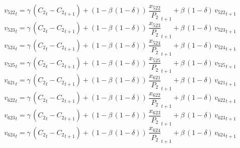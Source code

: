 \begin{dmath}
{{v_{522}}}_{t}={{\gamma}}\, \left({{C_{2}}}_{t}-{{C_{2}}}_{t+1}\right)+\left(1-{{\beta}}\, \left(1-{{\delta}}\right)\right)\, {{\frac{x_{522}}{P_{2}}}}_{t+1}+{{\beta}}\, \left(1-{{\delta}}\right)\, {{v_{522}}}_{t+1}
\end{dmath}
\begin{dmath}
{{v_{523}}}_{t}={{\gamma}}\, \left({{C_{2}}}_{t}-{{C_{2}}}_{t+1}\right)+\left(1-{{\beta}}\, \left(1-{{\delta}}\right)\right)\, {{\frac{x_{523}}{P_{2}}}}_{t+1}+{{\beta}}\, \left(1-{{\delta}}\right)\, {{v_{523}}}_{t+1}
\end{dmath}
\begin{dmath}
{{v_{524}}}_{t}={{\gamma}}\, \left({{C_{2}}}_{t}-{{C_{2}}}_{t+1}\right)+\left(1-{{\beta}}\, \left(1-{{\delta}}\right)\right)\, {{\frac{x_{524}}{P_{2}}}}_{t+1}+{{\beta}}\, \left(1-{{\delta}}\right)\, {{v_{524}}}_{t+1}
\end{dmath}
\begin{dmath}
{{v_{525}}}_{t}={{\gamma}}\, \left({{C_{2}}}_{t}-{{C_{2}}}_{t+1}\right)+\left(1-{{\beta}}\, \left(1-{{\delta}}\right)\right)\, {{\frac{x_{525}}{P_{2}}}}_{t+1}+{{\beta}}\, \left(1-{{\delta}}\right)\, {{v_{525}}}_{t+1}
\end{dmath}
\begin{dmath}
{{v_{621}}}_{t}={{\gamma}}\, \left({{C_{2}}}_{t}-{{C_{2}}}_{t+1}\right)+\left(1-{{\beta}}\, \left(1-{{\delta}}\right)\right)\, {{\frac{x_{621}}{P_{2}}}}_{t+1}+{{\beta}}\, \left(1-{{\delta}}\right)\, {{v_{621}}}_{t+1}
\end{dmath}
\begin{dmath}
{{v_{622}}}_{t}={{\gamma}}\, \left({{C_{2}}}_{t}-{{C_{2}}}_{t+1}\right)+\left(1-{{\beta}}\, \left(1-{{\delta}}\right)\right)\, {{\frac{x_{622}}{P_{2}}}}_{t+1}+{{\beta}}\, \left(1-{{\delta}}\right)\, {{v_{622}}}_{t+1}
\end{dmath}
\begin{dmath}
{{v_{623}}}_{t}={{\gamma}}\, \left({{C_{2}}}_{t}-{{C_{2}}}_{t+1}\right)+\left(1-{{\beta}}\, \left(1-{{\delta}}\right)\right)\, {{\frac{x_{623}}{P_{2}}}}_{t+1}+{{\beta}}\, \left(1-{{\delta}}\right)\, {{v_{623}}}_{t+1}
\end{dmath}
\begin{dmath}
{{v_{624}}}_{t}={{\gamma}}\, \left({{C_{2}}}_{t}-{{C_{2}}}_{t+1}\right)+\left(1-{{\beta}}\, \left(1-{{\delta}}\right)\right)\, {{\frac{x_{624}}{P_{2}}}}_{t+1}+{{\beta}}\, \left(1-{{\delta}}\right)\, {{v_{624}}}_{t+1}
\end{dmath}
